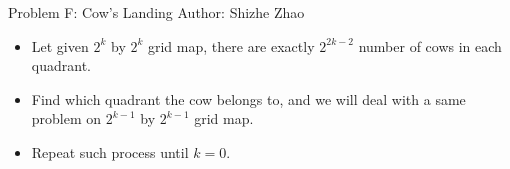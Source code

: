 \begin{frame}{Problem F: Cow's Landing}
\small Author: Shizhe Zhao
\begin{itemize}
  \item<2-> Let given $2^k$ by $2^k$ grid map,
    there are exactly $2^{2k-2}$ number of cows in each quadrant.
  \item<3-> Find which quadrant the cow belongs to, and we will deal with 
  a same problem on $2^{k-1}$ by $2^{k-1}$ grid map.
  \item<4-> Repeat such process until $k=0$.
\end{itemize}
\end{frame}
